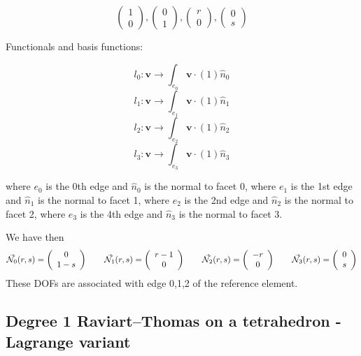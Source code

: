 \[
\left( \begin{array}{c} 1 \\ 0  \end{array} \right),
\left( \begin{array}{c} 0 \\ 1  \end{array} \right),
\left( \begin{array}{c} r \\ 0  \end{array} \right),
\left( \begin{array}{c} 0 \\ s  \end{array} \right)
\]

Functionals and basis functions:

\[
l_0: {\bm v} \rightarrow \int_{e_0} {\bm v} \cdot (1) \hat{n}_0
\]
\[
l_1: {\bm v} \rightarrow \int_{e_1} {\bm v} \cdot (1) \hat{n}_1
\]
\[
l_2: {\bm v} \rightarrow \int_{e_2} {\bm v} \cdot (1) \hat{n}_2
\]
\[
l_3: {\bm v} \rightarrow \int_{e_3} {\bm v} \cdot (1) \hat{n}_3
\]


where $e_0$ is the 0th edge and $\hat{n}_0$ is the normal to facet 0,
where $e_1$ is the 1st edge and $\hat{n}_1$ is the normal to facet 1,
where $e_2$ is the 2nd edge and $\hat{n}_2$ is the normal to facet 2,
where $e_3$ is the 4th edge and $\hat{n}_3$ is the normal to facet 3.


We have then
\[
\vec{{\mathcal{N}}}_0(r,s) = \left( \begin{array}{c} 0 \\ 1-s  \end{array} \right)
\qquad
\vec{{\mathcal{N}}}_1(r,s) = \left( \begin{array}{c} r-1 \\0  \end{array} \right)
\qquad
\vec{{\mathcal{N}}}_2(r,s) = \left( \begin{array}{c} -r \\ 0  \end{array} \right)
\qquad
\vec{{\mathcal{N}}}_3(r,s) = \left( \begin{array}{c} 0 \\s  \end{array} \right)
\]
These DOFs are associated with edge 0,1,2 of the reference element.


\subsection{Degree 1 Raviart–Thomas on a tetrahedron - Lagrange variant}


